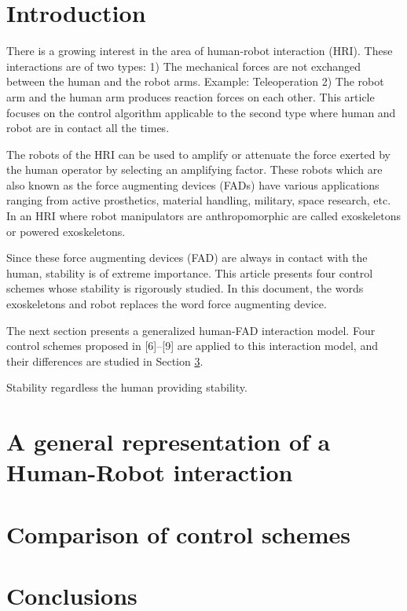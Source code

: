 \documentclass[preprint,12pt,3p]{elsarticle}
\begin{document}
\section{Introduction}
\label{Introduction}
There is a growing interest in the area of human-robot interaction (HRI). These interactions are of two types: 1) The mechanical forces are not exchanged between the human and the robot arms. Example: Teleoperation 2) The robot arm and the human arm produces reaction forces on each other. This article focuses on the control algorithm applicable to the second type where human and robot are in contact all the times.
\par
The robots of the HRI can be used to amplify or attenuate the force exerted by the human operator by selecting an amplifying factor. These robots which are also known as the force augmenting devices (FADs) have various applications ranging from active prosthetics, material handling, military, space research, etc. In an HRI where robot manipulators are anthropomorphic are called exoskeletons or powered exoskeletons.
\par
Since these force augmenting devices (FAD) are always in contact with the human, stability is of extreme importance. This article presents four control schemes whose stability is rigorously studied. In this document, the words exoskeletons and robot replaces the word force augmenting device.
\par
The next section presents a generalized human-FAD interaction model. Four control schemes proposed in [6]–[9] are applied to this interaction model, and their differences are studied in Section \ref{CCS}.
\par
Stability regardless the human providing stability.
\section{A general representation of a Human-Robot interaction}
\label{GHRI}
\section{Comparison of control schemes}
\label{CCS}
\section{Conclusions}
\label{Concl}



\end{document}

